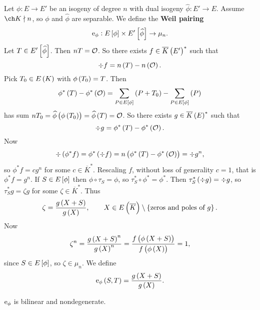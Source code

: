 Let $ \phi : E \to E' $ be an isogeny of degree $ n $ with dual isogeny $ \widehat{\phi} : E' \to E $. Assume $ \ch K \nmid n $, so $ \phi $ and $ \widehat{\phi} $ are separable. We define the \textbf{Weil pairing}
$$ \e_\phi : E\sbr{\phi} \times E'\sbr{\widehat{\phi}} \to \mu_n. $$
Let $ T \in E'\sbr{\widehat{\phi}} $. Then $ nT = \mathcal{O} $. So there exists $ f \in \overline{K}\br{E'}^* $ such that
$$ \div f = n\br{T} - n\br{\OOO}. $$
Pick $ T_0 \in E\br{K} $ with $ \phi\br{T_0} = T $. Then
$$ \phi^*\br{T} - \phi^*\br{\OOO} = \sum_{P \in E\sbr{\phi}} \br{P + T_0} - \sum_{P \in E\sbr{\phi}} \br{P} $$
has sum $ nT_0 = \widehat{\phi}\br{\phi\br{T_0}} = \widehat{\phi}\br{T} = \OOO $. So there exists $ g \in \overline{K}\br{E}^* $ such that
$$ \div g = \phi^*\br{T} - \phi^*\br{\OOO}. $$
Now
$$ \div \br{\phi^*f} = \phi^*\br{\div f} = n\br{\phi^*\br{T} - \phi^*\br{\OOO}} = \div g^n, $$
so $ \phi^*f = cg^n $ for some $ c \in \overline{K}^* $. Rescaling $ f $, without loss of generality $ c = 1 $, that is $ \phi^*f = g^n $. If $ S \in E\sbr{\phi} $ then $ \phi \circ \tau_S = \phi $, so $ \tau_S^* \circ \phi^* = \phi^* $. Then $ \tau_S^*\br{\div g} = \div g $, so $ \tau_S^*g = \zeta g $ for some $ \zeta \in \overline{K}^* $. Thus
$$ \zeta = \dfrac{g\br{X + S}}{g\br{X}}, \qquad X \in E\br{\overline{K}} \setminus \cbr{\text{zeros and poles of} \ g}. $$
Now
$$ \zeta^n = \dfrac{g\br{X + S}^n}{g\br{X}^n} = \dfrac{f\br{\phi\br{X + S}}}{f\br{\phi\br{X}}} = 1, $$
since $ S \in E\sbr{\phi} $, so $ \zeta \in \mu_n $. We define
$$ \e_\phi\br{S, T} = \dfrac{g\br{X + S}}{g\br{X}}. $$

\begin{proposition}
$ \mathrm{e}_\phi $ is bilinear and nondegenerate.
\end{proposition}

